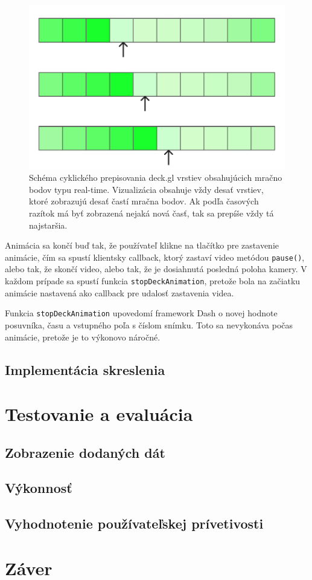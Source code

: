 \begin{figure}[h]
    \centering
    \includegraphics[width=0.4\linewidth]{text_prace/obrazky-figures/vrstvy_animacia.pdf}
    \caption{Schéma cyklického prepisovania deck.gl vrstiev obsahujúcich mračno bodov typu real-time. Vizualizácia obsahuje vždy desať vrstiev, ktoré zobrazujú desať častí mračna bodov. Ak podľa časových razítok má byť zobrazená nejaká nová časť, tak sa prepíše vždy tá najstaršia.}
    \label{fig:vrstvy_animacia}
\end{figure}

Animácia sa končí buď tak, že používateľ klikne na tlačítko pre zastavenie animácie, čím sa spustí klientsky callback, ktorý zastaví video metódou \texttt{pause()}, alebo tak, že skončí video, alebo tak, že je dosiahnutá posledná poloha kamery. V každom prípade sa spustí funkcia \texttt{stopDeckAnimation}, pretože bola na začiatku animácie nastavená ako callback pre udalosť zastavenia videa.

Funkcia \texttt{stopDeckAnimation} upovedomí framework Dash o novej hodnote posuvníka, času a vstupného poľa s číslom snímku. Toto sa nevykonáva počas animácie, pretože je to výkonovo náročné.

\section{Implementácia skreslenia}


\chapter{Testovanie a evaluácia}

\section{Zobrazenie dodaných dát}


\section{Výkonnosť}

\section{Vyhodnotenie používateľskej prívetivosti}

\chapter{Záver}



%
